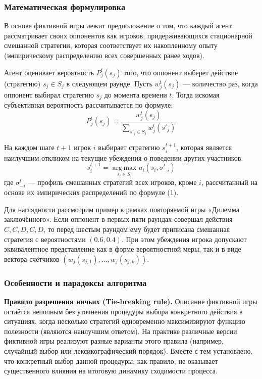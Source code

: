 \subsubsection{Математическая формулировка}

В основе фиктивной игры лежит предположение о том, что каждый агент рассматривает своих оппонентов как игроков, придерживающихся стационарной смешанной стратегии, которая соответствует их накопленному опыту (эмпирическому распределению всех совершенных ранее ходов).

Агент оценивает вероятность $P_j^t(s_j)$ того, что оппонент выберет действие (стратегию) $s_j \in S_j$ в следующем раунде. Пусть $w_j^t(s_j)$ --- количество раз, когда оппонент выбирал стратегию $s_j$ до момента времени $t$. Тогда искомая субъективная вероятность рассчитывается по формуле:
\begin{equation}
    P_j^t(s_j) = \frac{w_j^t(s_j)}{\sum_{s'_j \in S_j} w_j^t(s'_j)}
\end{equation}

На каждом шаге $t+1$ игрок $i$ выбирает стратегию $s_i^{t+1}$, которая является наилучшим откликом на текущие убеждения о поведении других участников:
\begin{equation}
    s_i^{t+1} = \operatorname*{arg\,max}_{s_i \in S_i} u_i(s_i, \sigma_{-i}^t)
\end{equation}
где $\sigma_{-i}^t$ --- профиль смешанных стратегий всех игроков, кроме $i$, рассчитанный на основе их эмпирических распределений по формуле (1).

Для наглядности рассмотрим пример в рамках повторяемой игры «Дилемма заключённого». Если оппонент в первых пяти раундах совершал действия $C, C, D, C, D$, то перед шестым раундом ему будет приписана смешанная стратегия с вероятностями $(0.6, 0.4)$. При этом убеждения игрока допускают эквивалентное представление как в форме вероятностной меры, так и в виде вектора счётчиков $(w_j(s_{j,1}), \dots, w_j(s_{j,k}))$.

\subsubsection{Особенности и парадоксы алгоритма}

\textbf{Правило разрешения ничьих (Tie-breaking rule).} 
Описание фиктивной игры остаётся неполным без уточнения процедуры выбора конкретного действия в ситуациях, когда несколько стратегий одновременно максимизируют функцию полезности (являются наилучшим ответом). На практике различные версии фиктивной игры реализуют разные варианты этого правила (например, случайный выбор или лексикографический порядок). Вместе с тем установлено, что конкретный выбор данной процедуры, как правило, не оказывает существенного влияния на итоговую динамику сходимости процесса.

